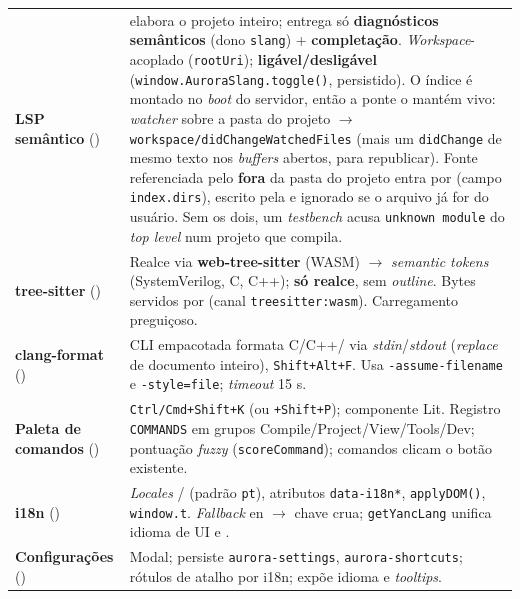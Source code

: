 \begin{table}[h]
\begin{tabularx}{\linewidth}{l Z}
\textbf{LSP semântico} () &  elabora o projeto inteiro; entrega só \textbf{diagnósticos semânticos} (dono \lstinline|slang|) + \textbf{completação}. \textit{Workspace}-acoplado (\lstinline|rootUri|); \textbf{ligável/desligável} (\lstinline|window.AuroraSlang.toggle()|, persistido). O índice é montado no \textit{boot} do servidor, então a ponte o mantém vivo: \textit{watcher}  sobre a pasta do projeto $\rightarrow$ \lstinline|workspace/didChangeWatchedFiles| (mais um \lstinline|didChange| de mesmo texto nos \textit{buffers} abertos, para republicar). Fonte referenciada pelo  \textbf{fora} da pasta do projeto entra por  (campo \lstinline|index.dirs|), escrito pela  e ignorado se o arquivo já for do usuário. Sem os dois, um \textit{testbench} acusa \lstinline|unknown module| do \textit{top level} num projeto que compila. \\
\textbf{tree-sitter} () & Realce via \textbf{web-tree-sitter} (WASM) $\rightarrow$ \textit{semantic tokens} (SystemVerilog, C, C++); \textbf{só realce}, sem \textit{outline}. Bytes servidos por  (canal \lstinline|treesitter:wasm|). Carregamento preguiçoso. \\
\textbf{clang-format} () & CLI empacotada formata C/C++/\cmm{} via \textit{stdin}/\textit{stdout} (\textit{replace} de documento inteiro), \lstinline|Shift+Alt+F|. Usa \lstinline|-assume-filename| e \lstinline|-style=file|; \textit{timeout} 15 s. \\
\textbf{Paleta de comandos} () & \lstinline|Ctrl/Cmd+Shift+K| (ou \lstinline|+Shift+P|); componente Lit. Registro \lstinline|COMMANDS| em grupos Compile/Project/View/Tools/Dev; pontuação \textit{fuzzy} (\lstinline|scoreCommand|); comandos clicam o botão existente. \\
\textbf{i18n} () & \textit{Locales} / (padrão \lstinline|pt|), atributos \lstinline|data-i18n*|, \lstinline|applyDOM()|, \lstinline|window.t|. \textit{Fallback} en $\rightarrow$ chave crua; \lstinline|getYancLang| unifica idioma de UI e . \\
\textbf{Configurações} () & Modal; persiste \lstinline|aurora-settings|, \lstinline|aurora-shortcuts|; rótulos de atalho por i18n; expõe idioma e \textit{tooltips}. \\

\end{tabularx}
\end{table}
